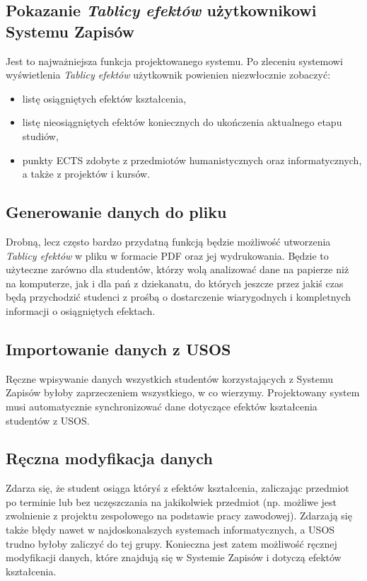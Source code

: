 \documentclass{article}
\begin{document}
\subsection{Pokazanie \textit{Tablicy efektów} użytkownikowi Systemu Zapisów}
Jest to najważniejsza funkcja projektowanego systemu.
Po zleceniu systemowi wyświetlenia \textit{Tablicy efektów} użytkownik powienien niezwłocznie zobaczyć:
\begin{itemize}
	\item listę osiągniętych efektów kształcenia,
	\item listę nieosiągniętych efektów koniecznych do ukończenia aktualnego etapu studiów,
	\item punkty ECTS zdobyte z przedmiotów humanistycznych oraz informatycznych, a także z projektów i kursów.
\end{itemize}

\subsection{Generowanie danych do pliku}
Drobną, lecz często bardzo przydatną funkcją będzie możliwość utworzenia \textit{Tablicy efektów} w pliku w formacie PDF oraz jej wydrukowania.
Będzie to użyteczne zarówno dla studentów, którzy wolą analizować dane na papierze niż na komputerze, jak i dla pań z dziekanatu, do których jeszcze przez jakiś czas będą przychodzić studenci z prośbą o dostarczenie wiarygodnych i kompletnych informacji o osiągniętych efektach.

\subsection{Importowanie danych z USOS} %
Ręczne wpisywanie danych wszystkich studentów korzystających z Systemu Zapisów byłoby zaprzeczeniem wszystkiego, w co wierzymy.
Projektowany system musi automatycznie synchronizować dane dotyczące efektów kształcenia studentów z USOS.

\subsection{Ręczna modyfikacja danych}
Zdarza się, że student osiąga któryś z efektów kształcenia, zaliczając przedmiot po terminie lub bez uczęszczania na jakikolwiek przedmiot (np. możliwe jest zwolnienie z projektu zespołowego na podstawie pracy zawodowej).
Zdarzają się także błędy nawet w najdoskonalszych systemach informatycznych, a USOS trudno byłoby zaliczyć do tej grupy.
Konieczna jest zatem możliwość ręcznej modyfikacji danych, które znajdują się w Systemie Zapisów i dotyczą efektów kształcenia.
\end{document}
